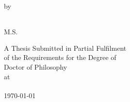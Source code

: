 \pagestyle{empty}
\newpage
\addtocounter{page}{-1}
\begin{center}
\vspace*{2cm}
\huge{ \bf \ttitle}
\end{center}

\vspace{20mm}
\begin{center}
by

\vspace{10mm}
{\bf \authorname}\\
M.S. \textit{\msunivname}
\end{center}

\vspace{30mm}
\begin{center}
A Thesis Submitted in Partial Fulfilment \\
of the Requirements for the Degree of \\
Doctor of Philosophy \\
\vspace{10mm}
at \\
\vspace{10mm}
\univname\\
\monthyeardate\today
\end{center}